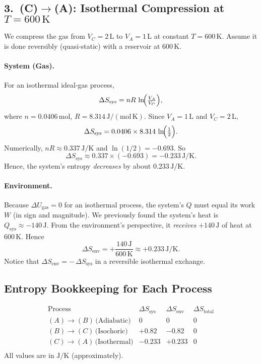 \documentclass[12pt]{article}
\theoremstyle{definition} %
\theoremstyle{plain} %
\begin{document}
\subsection*{3.\ (C)\(\to\)(A): Isothermal Compression at \(T=600\,\mathrm{K}\)}

We compress the gas from \(V_C=2\,\mathrm{L}\) to \(V_A=1\,\mathrm{L}\) at constant \(T=600\,\mathrm{K}\).  Assume it is done reversibly (quasi‐static) with a reservoir at \(600\,\mathrm{K}\).

\paragraph{System (Gas).}  
For an isothermal ideal‐gas process,
\[
\Delta S_{\mathrm{sys}} 
= nR\,\ln\!\Bigl(\tfrac{V_A}{V_C}\Bigr),
\]
where \(n=0.0406\,\mathrm{mol}\), \(R=8.314\,\mathrm{J/(mol\,K)}\). Since \(V_A=1\,\mathrm{L}\) and \(V_C=2\,\mathrm{L}\),
\[
\Delta S_{\mathrm{sys}} 
= 0.0406 \times 8.314
  \,\ln\!\Bigl(\tfrac{1}{2}\Bigr).
\]
Numerically, \(nR \approx 0.337\,\mathrm{J/K}\) and \(\ln(1/2)=-0.693\). So
\[
\Delta S_{\mathrm{sys}} \approx 0.337 \times (-0.693) 
= -0.233\,\mathrm{J/K}.
\]
Hence, the system’s entropy \emph{decreases} by about \(0.233\,\mathrm{J/K}\).

\paragraph{Environment.}  
Because \(\Delta U_{\mathrm{gas}}=0\) for an isothermal process, the system’s \(Q\) must equal its work \(W\) (in sign and magnitude).  We previously found the system’s heat is \(Q_{\mathrm{sys}} \approx -140\,\mathrm{J}\).  From the environment’s perspective, it \emph{receives} \(+140\,\mathrm{J}\) of heat at \(600\,\mathrm{K}\).  Hence
\[
\Delta S_{\mathrm{env}}
= +\frac{140\,\mathrm{J}}{600\,\mathrm{K}}
\approx +0.233\,\mathrm{J/K}.
\]
Notice that \(\Delta S_{\mathrm{env}} = -\,\Delta S_{\mathrm{sys}}\) in a reversible isothermal exchange.

\subsection*{Entropy Bookkeeping for Each Process}

\[
\begin{array}{lcccc}

\text{Process} 
& \Delta S_{\mathrm{sys}} & \Delta S_{\mathrm{env}} & \Delta S_{\text{total}} \\

(A)\to(B)\,\text{(Adiabatic)} & 0    & 0    & 0 \\
(B)\to(C)\,\text{(Isochoric)} & +0.82 & -0.82 & 0 \\
(C)\to(A)\,\text{(Isothermal)}& -0.233 & +0.233 & 0 \\

\end{array}
\]
All values are in \(\mathrm{J/K}\) (approximately).
\end{document}
